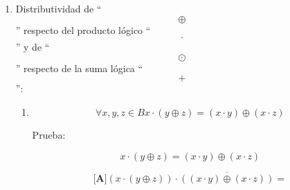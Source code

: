 \documentclass[
]{article}
\begin{document}
\begin{enumerate}
\begin{enumerate}
\begin{enumerate}
\begin{enumerate}
        \[{= {({{({\overline{a} + b})} \cdot {({a + \overline{b}})}})}} \odot {c =}\]

        \[{= {{({\overline{({{({\overline{a}+b})}\cdot{({a+\overline{b}})}})} + c})} \cdot {({{({{({\overline{a} + b})} \cdot {({a + \overline{b}})}})} + \overline{c}})}}} =\]

        \[{= {{({\overline{({{({\overline{a}+b})}\cdot{({a+\overline{b}})}})} + c})} \cdot {({{({{({\overline{a} + b})} \cdot {({a + \overline{b}})}})} + \overline{c}})}}} =\]

        \[{= {{{({{({\overline{({\overline{a}+b})} + \overline{({a+\overline{b}})}})} + c})} \cdot {({{\overline{a} + b} + \overline{c}})}} \cdot {({{a + \overline{b}} + \overline{c}})}}} =\]

        \[{= {{{({{({{({a \cdot \overline{b}})} + {({\overline{a} \cdot b})}})} + c})} \cdot {({{\overline{a} + b} + \overline{c}})}} \cdot {({{a + \overline{b}} + \overline{c}})}}} =\]

        \[{= {{{{({{a \cdot b} \cdot c})} + {({{\overline{a} \cdot \overline{b}} \cdot c})}} + {({{\overline{a} \cdot b} \cdot \overline{c}})}} + {({{a \cdot \overline{b}} \cdot \overline{c}})}}} =\]

        \[{= {{({a \cdot {({{({b \cdot c})} + {({\overline{b} \cdot \overline{c}})}})}})} + {({\overline{a} \cdot {({{({\overline{b} \cdot c})} + {({b + \overline{c}})}})}})}}} =\]

        \[{= {{({a + {({b \oplus c})}})} \cdot {({\overline{a} + {({b \odot c})}})}}} =\]

        \[{= {{({a \cdot \overline{({b\oplus c})}})} + {({\overline{a} \cdot {({b \oplus c})}})}}} =\]

        \[{= a} \odot {({b \odot c})}\]
      \end{enumerate}
    \item
      Distributividad de ``\[\oplus\]'' respecto del producto lógico
      ``\[\cdot\]'' y de ``\[\odot\]'' res\-pecto de la suma lógica
      ``\[+\]'':

      \begin{enumerate}
      \def\labelenumiv{\arabic{enumiv}.}
      \item
        \[\forall x,y,{z \in B}{{x \cdot {({y \oplus z})}} = {({x \cdot y})}} \oplus {({x \cdot z})}\]

        Prueba:

        \[{{x \cdot {({y \oplus z})}} = {({x \cdot y})}} \oplus {({x \cdot z})}\]

        \[{\lbrack\mathbf{A}\rbrack}{{{({x \cdot {({y \oplus z})}})} \cdot \overline{({{({x\cdot y})}\oplus{({x\cdot z})}})}} =}\]


\end{enumerate}
\end{enumerate}
\end{enumerate}
\end{enumerate}
\end{document}
